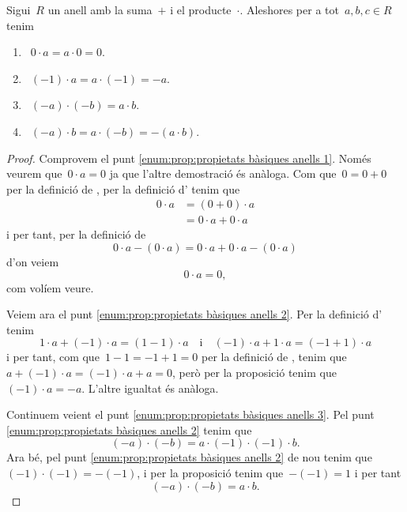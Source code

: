 \documentclass[../../main.tex]{subfiles}
\begin{document}
    \begin{proposition}
        \label{prop:propietats bàsiques anells}
        Sigui~\(R\) un anell amb la suma~\(+\) i el producte~\(\cdot\).
        Aleshores per a tot~\(a,b,c\in R\) tenim
        \begin{enumerate}
            \item\label{enum:prop:propietats bàsiques anells 1}~\(0\cdot a=a\cdot0=0\).
            \item\label{enum:prop:propietats bàsiques anells 2}~\((-1)\cdot a=a\cdot(-1)=-a\).
            \item\label{enum:prop:propietats bàsiques anells 3}~\((-a)\cdot(-b)=a\cdot b\).
            \item\label{enum:prop:propietats bàsiques anells 4}~\((-a)\cdot b=a\cdot(-b)=-(a\cdot b)\).
        \end{enumerate}
        \begin{proof}
            Comprovem el punt \eqref{enum:prop:propietats bàsiques anells 1}.
            Només veurem que~\(0\cdot a=0\) ja que l'altre demostració és anàloga.
            Com que~\(0=0+0\) per la definició de , per la definició d' tenim que
            \begin{align*}
            0\cdot a&=(0+0)\cdot a\\
            &=0\cdot a+0\cdot a
            \end{align*}
            i per tant, per la definició de 
            \[
                0\cdot a-(0\cdot a)=0\cdot a+0\cdot a-(0\cdot a)
            \]
            d'on veiem
            \[
                0\cdot a=0,
            \]
            com volíem veure.

            Veiem ara el punt \eqref{enum:prop:propietats bàsiques anells 2}.
            Per la definició d' tenim
            \[
                1\cdot a+(-1)\cdot a=(1-1)\cdot a\quad\text{i}\quad(-1)\cdot a+1\cdot a=(-1+1)\cdot a
            \]
            i per tant, com que~\(1-1=-1+1=0\) per la definició de , tenim que~\(a+(-1)\cdot a=(-1)\cdot a+a=0\), però per la proposició  tenim que~\((-1)\cdot a=-a\).
            L'altre igualtat és anàloga.

            Continuem veient el punt \eqref{enum:prop:propietats bàsiques anells 3}.
            Pel punt \eqref{enum:prop:propietats bàsiques anells 2} tenim que
            \[
                (-a)\cdot(-b)=a\cdot (-1)\cdot(-1)\cdot b.
            \]
            Ara bé, pel punt \eqref{enum:prop:propietats bàsiques anells 2} de nou tenim que~\((-1)\cdot(-1)=-(-1)\), i per la proposició  tenim que~\(-(-1)=1\) i per tant
            \[
                (-a)\cdot(-b)=a\cdot b.
            \]


\end{proof}
\end{proposition}
\end{document}
